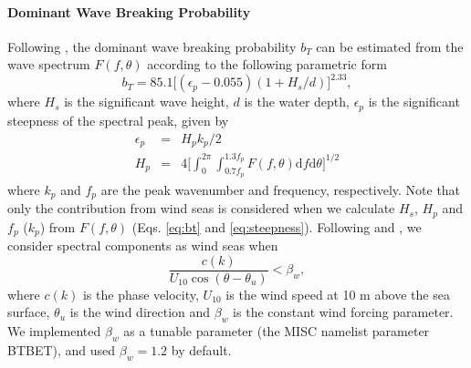 \noindent
\paragraph{Dominant Wave Breaking Probability}
Following \citet[][their Fig.~12]{art:BBY01}, the dominant wave breaking probability $b_T$ can be estimated from the wave spectrum $F(f, \theta)$ according to the following parametric form
\begin{equation}
b_T = 85.1 \Big[ (\epsilon_p - 0.055) (1 + H_s / d) \Big]^{2.33},
\label{eq:bt}
\end{equation}
where $H_s$ is the significant wave height, $d$ is the water depth, $\epsilon_p$ is the significant steepness of the spectral peak, given by
\begin{equation}
\begin{array}{rcl}
\epsilon_p &=& H_p k_p / 2\\
H_p &=& 4 \Big[\int_{0}^{2\pi} \int_{0.7f_p}^{1.3f_p} F(f, \theta) \mathrm{d}f \mathrm{d}\theta \Big]^{1/2}
\label{eq:steepness}
\end{array}
\end{equation}
where $k_p$ and $f_p$ are the peak wavenumber and frequency, respectively. Note that only the contribution from wind seas is considered when we calculate $H_s$, $H_p$ and $f_p$ ($k_p$) from $F(f, \theta)$ (Eqs. \ref{eq:bt} and \ref{eq:steepness}). Following \citet{Janssen1989} and \citet{Bidlot2001}, we consider spectral components as wind seas when
\begin{equation}
\frac{c(k)}{U_{10} \cos (\theta - \theta_u)}  < \beta_w,
\label{eq:beta}
\end{equation}
where $c(k)$ is the phase velocity, $U_{10}$ is the wind speed at 10 m above the sea surface, $\theta_u$ is the wind direction and $\beta_w$ is the constant wind forcing parameter. We implemented $\beta_w$ as a tunable parameter (the {\F MISC} namelist parameter {\code BTBET}), and used $\beta_w=1.2$ by default.

\noindent
